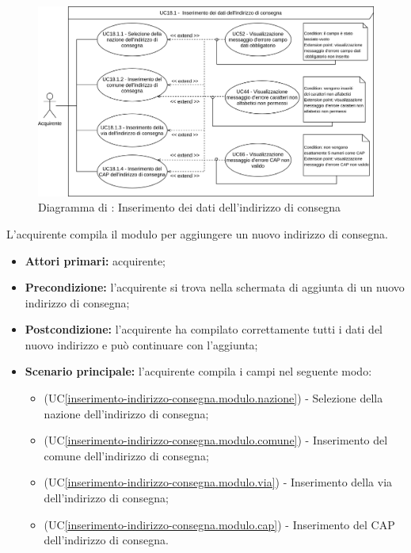 \label{inserimento-indirizzo-consegna.modulo}

\begin{figure}[H]
    \centering
    \includegraphics[scale=0.6]{Immagini/DiagrammiUC/InserimentoDatiIndirizzoConsegna.png}
    \caption{Diagramma di \actualSubUC: Inserimento dei dati dell'indirizzo di consegna} 
    \label{fig:InserimentoDatiIndirizzoConsegna}
\end{figure}

L'acquirente compila il modulo per aggiungere un nuovo indirizzo di consegna.
\begin{itemize}
	\item \textbf{Attori primari:} acquirente;
	\item \textbf{Precondizione:} l'acquirente si trova nella schermata di aggiunta di un nuovo indirizzo di consegna;
	\item \textbf{Postcondizione:} l'acquirente ha compilato correttamente tutti i dati del nuovo indirizzo e può continuare con l'aggiunta;
	\item \textbf{Scenario principale:} l'acquirente compila i campi nel seguente modo:
	\begin{itemize}
		\item (UC\ref{inserimento-indirizzo-consegna.modulo.nazione}) - Selezione della nazione dell'indirizzo di consegna;
		\item (UC\ref{inserimento-indirizzo-consegna.modulo.comune}) - Inserimento del comune dell'indirizzo di consegna;
		\item (UC\ref{inserimento-indirizzo-consegna.modulo.via}) - Inserimento della via dell'indirizzo di consegna;
		\item (UC\ref{inserimento-indirizzo-consegna.modulo.cap}) - Inserimento del CAP dell'indirizzo di consegna.
	\end{itemize}
\end{itemize}

